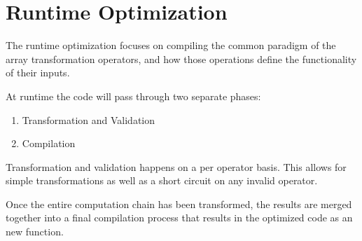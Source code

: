 \section{Runtime Optimization}
The runtime optimization focuses on compiling the common paradigm of the array transformation operators, and how those operations define the functionality of their inputs.

At runtime the code will pass through two separate phases:

\begin{enumerate}
  \item Transformation and Validation
  \item Compilation
\end{enumerate}

Transformation and validation happens on a per operator basis.  This allows for simple transformations as well as a short circuit on any invalid operator.

Once the entire computation chain has been transformed, the results are merged together into a final compilation process that results in the optimized code as an new function. 

\begin{minipage}{\linewidth}

\end{minipage}


